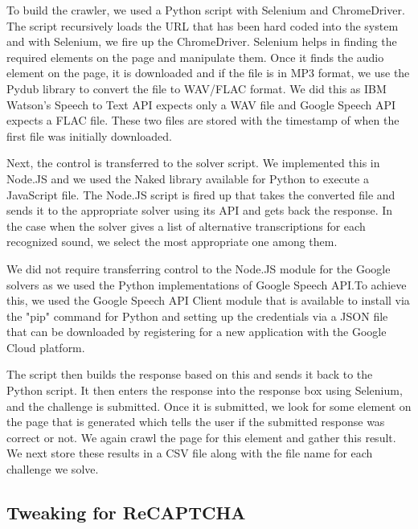 To build the crawler, we used a Python script with Selenium and ChromeDriver. The script recursively loads the URL that has been hard coded into the system and with Selenium, we fire up the ChromeDriver. Selenium helps in finding the required elements on the page and manipulate them. Once it finds the audio element on the page, it is downloaded and if the file is in MP3 format, we use the Pydub library to convert the file to WAV/FLAC format. We did this as IBM Watson's Speech to Text API expects only a WAV file and Google Speech API expects a FLAC file. These two files are stored with the timestamp of when the first file was initially downloaded.\newline

Next, the control is transferred to the solver script. We implemented this in Node.JS and we used the Naked library available for Python to execute a JavaScript file. The Node.JS script is fired up that takes the converted file and sends it to the appropriate solver using its API and gets back the response. In the case when the solver gives a list of alternative transcriptions for each recognized sound, we select the most appropriate one among them.\newline

We did not require transferring control to the Node.JS module for the Google solvers as we used the Python implementations of Google Speech API.To achieve this, we used the Google Speech API Client module that is available to install via the "pip" command for Python and setting up the credentials via a JSON file that can be downloaded by registering for a new application with the Google Cloud platform. \newline

The script then builds the response based on this and sends it back to the Python script. It then enters the response into the response box using Selenium, and the challenge is submitted. Once it is submitted, we look for some element on the page that is generated which tells the user if the submitted response was correct or not. We again crawl the page for this element and gather this result. We next store these results in a CSV file along with the file name for each challenge we solve. \newline

\subsection{Tweaking for ReCAPTCHA}
\label{sec:recaptcha}

